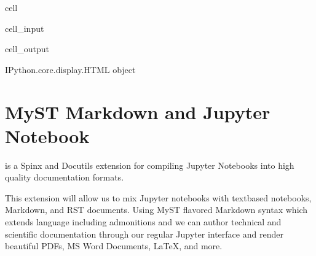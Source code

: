 \documentclass[letterpaper,12pt,english]{sphinxmanual}
\begin{document}
\begin{sphinxuseclass}{cell}
\begin{sphinxuseclass}{cell_input}
\begin{sphinxVerbatim}[commandchars=\\\{\}]
\end{sphinxVerbatim}

\end{sphinxuseclass}
\begin{sphinxuseclass}{cell_output}
\begin{sphinxVerbatim}[commandchars=\\\{\}]
\PYGZlt{}IPython.core.display.HTML object\PYGZgt{}
\end{sphinxVerbatim}

\end{sphinxuseclass}
\end{sphinxuseclass}

\chapter{MyST Markdown and Jupyter Notebook}
\label{\detokenize{notebooks/02-myst.integration:myst-markdown-and-jupyter-notebook}}\label{\detokenize{notebooks/02-myst.integration::doc}}
\sphinxAtStartPar
{} is a Spinx and Docutils extension for compiling Jupyter Notebooks into high quality documentation formats.

\sphinxAtStartPar
This extension will allow us to mix Jupyter notebooks with text\sphinxhyphen{}based notebooks, Markdown, and RST documents. Using MyST flavored Markdown syntax \textendash{}which extends  language including admonitions and \textendash{} we can author technical and scientific documentation through our regular Jupyter interface and render beautiful PDFs, MS Word Documents, LaTeX, and more.
\end{document}

